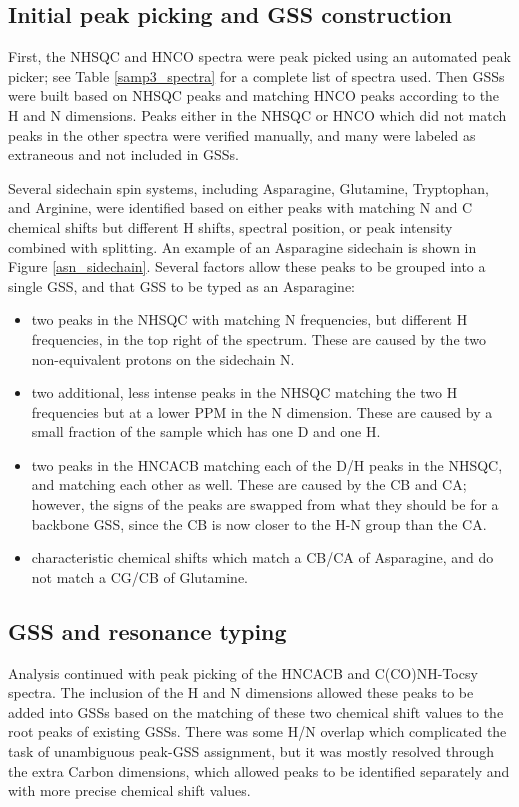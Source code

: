 \subsection*{Initial peak picking and GSS construction}
First, the NHSQC and HNCO spectra were peak picked using an automated 
peak picker; see Table \ref{samp3_spectra} for a complete list of spectra
used.  Then GSSs were built based on NHSQC peaks and matching HNCO peaks
according to the H and N dimensions.  Peaks either in the NHSQC or HNCO
which did not match peaks in the other spectra were verified manually, and
many were labeled as extraneous and not included in GSSs.

Several sidechain spin systems, including Asparagine, Glutamine, Tryptophan,
and Arginine, were identified based on either peaks with matching N and C
chemical shifts but different H shifts, spectral position, or peak intensity
combined with splitting.  An example of an Asparagine sidechain is shown in
Figure \ref{asn_sidechain}.  Several factors allow these peaks to be grouped
into a single GSS, and that GSS to be typed as an Asparagine:
\begin{itemize}
  \item two peaks in the NHSQC with matching N frequencies, but different H
    frequencies, in the top right of the spectrum.  These are caused by the
    two non-equivalent protons on the sidechain N.
  \item two additional, less intense peaks in the NHSQC matching the two
    H frequencies but at a lower PPM in the N dimension.  These are caused by
    a small fraction of the sample which has one D and one H.
  \item two peaks in the HNCACB matching each of the D/H peaks in the NHSQC,
    and matching each other as well.  These are caused by the CB and CA; 
    however, the signs of the peaks are swapped from what they should be for
    a backbone GSS, since the CB is now closer to the H-N group than the CA.
  \item characteristic chemical shifts which match a CB/CA of Asparagine, 
    and do not match a CG/CB of Glutamine.
\end{itemize}

\subsection*{GSS and resonance typing}
Analysis continued with peak picking of the HNCACB and C(CO)NH-Tocsy spectra.
The inclusion of the H and N dimensions allowed these peaks to be added into
GSSs based on the matching of these two chemical shift values to the
root peaks of existing GSSs.  There was some H/N overlap which complicated the
task of unambiguous peak-GSS assignment, but it was mostly resolved through
the extra Carbon dimensions, which allowed peaks to be identified separately
and with more precise chemical shift values.

